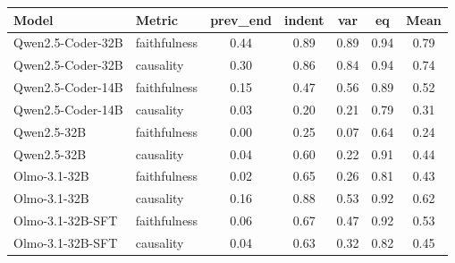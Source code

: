 \begin{tabular}{llccccc}
\toprule
Model & Metric & prev\_end & indent & var & eq & Mean \\
\midrule
Qwen2.5-Coder-32B & faithfulness & 0.44 & 0.89 & 0.89 & 0.94 & 0.79 \\
Qwen2.5-Coder-32B & causality & 0.30 & 0.86 & 0.84 & 0.94 & 0.74 \\
Qwen2.5-Coder-14B & faithfulness & 0.15 & 0.47 & 0.56 & 0.89 & 0.52 \\
Qwen2.5-Coder-14B & causality & 0.03 & 0.20 & 0.21 & 0.79 & 0.31 \\
Qwen2.5-32B & faithfulness & 0.00 & 0.25 & 0.07 & 0.64 & 0.24 \\
Qwen2.5-32B & causality & 0.04 & 0.60 & 0.22 & 0.91 & 0.44 \\
Olmo-3.1-32B & faithfulness & 0.02 & 0.65 & 0.26 & 0.81 & 0.43 \\
Olmo-3.1-32B & causality & 0.16 & 0.88 & 0.53 & 0.92 & 0.62 \\
Olmo-3.1-32B-SFT & faithfulness & 0.06 & 0.67 & 0.47 & 0.92 & 0.53 \\
Olmo-3.1-32B-SFT & causality & 0.04 & 0.63 & 0.32 & 0.82 & 0.45 \\
\bottomrule
\end{tabular}
